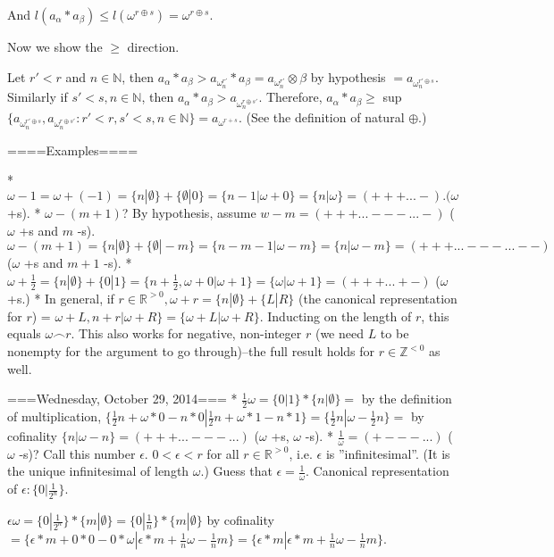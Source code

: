 And $l(a_\alpha * a_\beta) \leq l(\omega^{r \oplus s}) = \omega^{r \oplus s}$.

Now we show the $\geq$ direction.

Let $r'<r$ and $n \in \mathbb{N}$, then $a_\alpha * a_\beta > a_{\omega^{r'}_n} * a_{\beta}=a_{\omega^{r'}_n} \otimes \beta$ by hypothesis $=a_{\omega^{r' \oplus s}_n}$. Similarly if $s'<s, n \in \mathbb{N}$, then $a_\alpha * a_\beta > a_{\omega^{r \oplus s'}_n}$. Therefore, $a_\alpha * a_\beta \geq$ sup $\{a_{\omega^{r' \oplus s}_n}, a_{\omega^{r \oplus s'}_n}  : r' <r, s' <s, n \in \mathbb{N} \} = a_{\omega^{r+s}}$. (See the definition of natural $\oplus$.)

====Examples====

* $\omega -1 = \omega + (-1) = \{n|\emptyset \} + \{\emptyset|0\}=\{n-1|\omega + 0\}= \{n|\omega\} = (+++...-). (\omega$ +s).
* $\omega - (m+1)$? By hypothesis, assume $w-m = (+++...---...-)$ ($\omega$ +s and $m$ -s). $\omega - (m+1)= \{n|\emptyset \} + \{\emptyset|-m\} = \{n-m-1|\omega -m\} = \{n|\omega-m\} = (+++...---...--)$ ($\omega$ +s and $m+1$ -s).
* $\omega + \frac{1}{2} = \{n|\emptyset \} + \{0|1\} = \{n + \frac{1}{2}, \omega + 0 | \omega +1\} = \{\omega | \omega +1\}=(+++...+-)$ ($\omega$ +s.)
* In general, if $r \in \mathbb{R}^{>0}, \omega + r = \{n|\emptyset \} + \{L|R\}$ (the canonical representation for $r$) = $\omega + L, n+r | \omega +R\} = \{\omega + L | \omega + R \}$. Inducting on the length of $r$, this equals $\omega \frown r$. This also works for negative, non-integer $r$ (we need $L$ to be nonempty for the argument to go through)--the full result holds for $r \in \mathbb{Z}^{<0}$ as well.

===Wednesday, October 29, 2014===
* $\frac{1}{2} \omega = \{0|1\}*\{n|\emptyset \}=$ by the definition of multiplication, $\{\frac{1}{2} n + \omega * 0 - n*0 | \frac{1}{2} n + \omega * 1 - n*1\}=\{\frac{1}{2} n|\omega -\frac{1}{2} n\}=$ by cofinality $\{n|\omega -n\}= (+++...---...)$ ($\omega$ +s, $\omega$ -s).
* $\frac{1}{\omega}= (+---...)$ ($\omega$ -s)? Call this number $\epsilon$. $0<\epsilon <r$ for all $r \in \mathbb{R}^{>0}$, i.e. $\epsilon$ is ''infinitesimal''. (It is the unique infinitesimal of length $\omega$.) Guess that $\epsilon = \frac{1}{\omega}$. Canonical representation of $\epsilon: \{0|\frac{1}{2^n}\}$.

$\epsilon \omega = \{0|\frac{1}{2^n}\}*\{m|\emptyset \}=\{0|\frac{1}{n}\}*\{m|\emptyset \}$ by cofinality $=\{\epsilon *m +0*0-0*\omega|\epsilon *m+\frac{1}{n}\omega - \frac{1}{n}m\}= \{\epsilon *m|\epsilon *m+\frac{1}{n}\omega - \frac{1}{n}m\}.$

